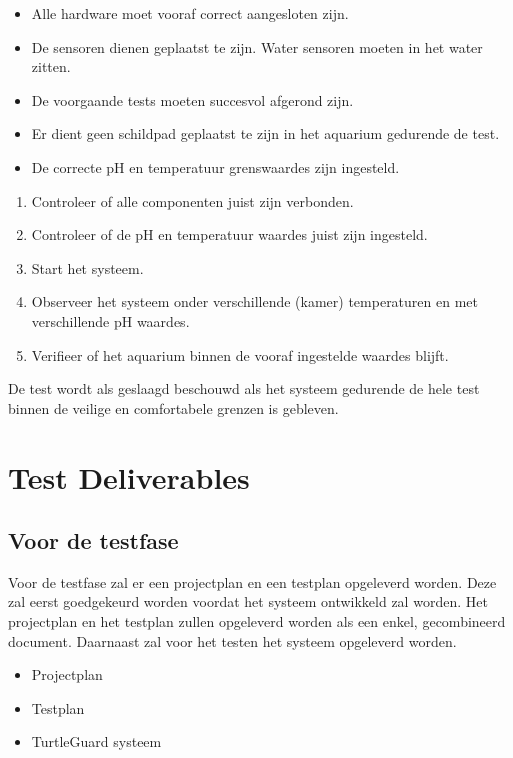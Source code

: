 \documentclass[a4paper]{report}
\newcommand{\turtleguard}{\mbox{TurtleGuard\texttrademark}\xspace}
\begin{document}
\begin{tcolorbox}[colback=white, colframe=black, title=Test Criteria]
  \begin{itemize}
    \item Alle hardware moet vooraf correct aangesloten zijn.
    \item De sensoren dienen geplaatst te zijn. Water sensoren moeten in het water zitten.
    \item De voorgaande tests moeten succesvol afgerond zijn. 
    \item Er dient geen schildpad geplaatst te zijn in het aquarium gedurende de test.
    \item De correcte pH en temperatuur grenswaardes zijn ingesteld.
  \end{itemize}
\end{tcolorbox}

\begin{tcolorbox}[colback=white, colframe=black, title=Test Stappen]
  \begin{enumerate}
    \item Controleer of alle componenten juist zijn verbonden.
    \item Controleer of de pH en temperatuur waardes juist zijn ingesteld. 
    \item Start het systeem.
    \item Observeer het systeem onder verschillende (kamer) temperaturen en met verschillende pH waardes. 
    \item Verifieer of het aquarium binnen de vooraf ingestelde waardes blijft.
  \end{enumerate}
\end{tcolorbox}

\begin{tcolorbox}[colback=white, colframe=black, title=Slagingscriteria]
  De test wordt als geslaagd beschouwd als het systeem gedurende de hele test binnen de veilige en comfortabele grenzen is gebleven.
\end{tcolorbox}


\chapter{Test Deliverables}
\section{Voor de testfase}
Voor de testfase zal er een projectplan en een testplan opgeleverd worden. Deze zal eerst goedgekeurd worden voordat het systeem ontwikkeld zal worden. 
Het projectplan en het testplan zullen opgeleverd worden als een enkel, gecombineerd document. 
Daarnaast zal voor het testen het systeem opgeleverd worden.
\begin{itemize}
    \item Projectplan
    \item Testplan
    \item \turtleguard systeem
\end{itemize}
\end{document}
